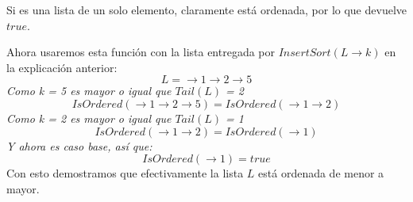 \documentclass[../doc.tex]{subfiles}
\begin{document}
Si es una lista de un solo elemento, claramente está ordenada, por lo que 
devuelve $true$.

Ahora usaremos esta función con la lista entregada por $InsertSort(L \rightarrow k)$ en la explicación anterior:
\[L = \rightarrow 1 \rightarrow 2 \rightarrow 5\]
\emph{Como k = 5 es mayor o igual que $Tail(L)$ = 2}
\[IsOrdered(\rightarrow 1 \rightarrow 2 \rightarrow 5) = IsOrdered(\rightarrow 1 \rightarrow 2)\]
\emph{Como k = 2 es mayor o igual que $Tail(L)$ = 1}
\[IsOrdered(\rightarrow 1 \rightarrow 2) = IsOrdered(\rightarrow 1)\]
\emph{Y ahora es caso base, así que: }
\[IsOrdered(\rightarrow 1) = true\]
Con esto demostramos que efectivamente la lista $L$ está ordenada de menor a mayor. 
\end{document}
